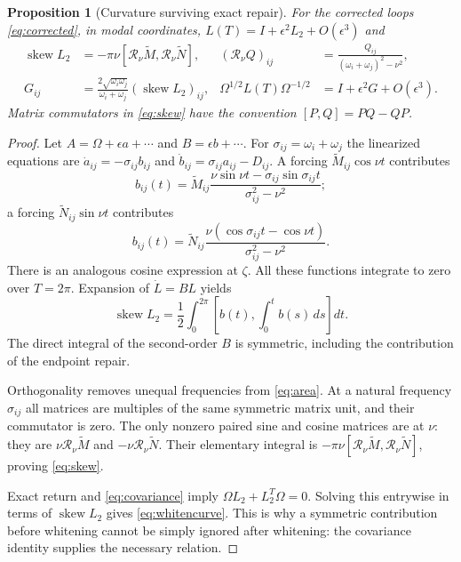 \documentclass[11pt]{article}
\numberwithin{equation}{section}
\newtheorem{proposition}[proposition]{Proposition}
\theoremstyle{definition}
\newcommand{\skw}{\operatorname{skew}}
\begin{document}
\begin{proposition}[Curvature surviving exact repair]\label{prop:curvature}
For the corrected loops \eqref{eq:corrected}, in modal coordinates,
$L(T)=I+\epsilon^2L_2+O(\epsilon^3)$ and
\begin{align}
 \skw L_2
   &=-\pi\nu[\mathcal R_\nu\widetilde M,
                        \mathcal R_\nu\widetilde N],
       &(\mathcal R_\nu Q)_{ij}
          &=\frac{Q_{ij}}{(\omega_i+\omega_j)^2-\nu^2},\label{eq:skew}\\
 G_{ij}
   &=\frac{2\sqrt{\omega_i\omega_j}}{\omega_i+\omega_j}
                      (\skw L_2)_{ij},
       &\Omega^{1/2}L(T)\Omega^{-1/2}
          &=I+\epsilon^2G+O(\epsilon^3).\label{eq:whitencurve}
\end{align}
Matrix commutators in \eqref{eq:skew} have the convention $[P,Q]=PQ-QP$.
\end{proposition}

\begin{proof}
Let $A=\Omega+\epsilon a+\cdots$ and $B=\epsilon b+\cdots$.
For $\sigma_{ij}=\omega_i+\omega_j$ the linearized equations are
$\dot a_{ij}=-\sigma_{ij}b_{ij}$ and
$\dot b_{ij}=\sigma_{ij}a_{ij}-D_{ij}$.
A forcing $\widetilde M_{ij}\cos\nu t$ contributes
\[
 b_{ij}(t)=\widetilde M_{ij}
       \frac{\nu\sin\nu t-\sigma_{ij}\sin\sigma_{ij}t}
            {\sigma_{ij}^2-\nu^2};
\]
a forcing $\widetilde N_{ij}\sin\nu t$ contributes
\[
 b_{ij}(t)=\widetilde N_{ij}
       \frac{\nu(\cos\sigma_{ij}t-\cos\nu t)}
            {\sigma_{ij}^2-\nu^2}.
\]
There is an analogous cosine expression at $\zeta$.
All these functions integrate to zero over $T=2\pi$.
Expansion of $\dot L=BL$ yields
\begin{equation}\label{eq:area}
 \skw L_2=\frac12\int_0^{2\pi}
       \left[b(t),\int_0^t b(s)\,ds\right]dt .
\end{equation}
The direct integral of the second-order $B$ is symmetric,
including the contribution of the endpoint repair.

Orthogonality removes unequal frequencies from \eqref{eq:area}.
At a natural frequency $\sigma_{ij}$ all matrices are multiples
of the same symmetric matrix unit, and their commutator is zero.
The only nonzero paired sine and cosine matrices are at $\nu$:
they are $\nu\mathcal R_\nu\widetilde M$ and
$-\nu\mathcal R_\nu\widetilde N$. Their elementary integral
is $-\pi\nu[\mathcal R_\nu\widetilde M,
\mathcal R_\nu\widetilde N]$, proving \eqref{eq:skew}.

Exact return and \eqref{eq:covariance} imply
$\Omega L_2+L_2^T\Omega=0$.
Solving this entrywise in terms of $\skw L_2$ gives
\eqref{eq:whitencurve}. This is why a symmetric contribution
before whitening cannot be simply ignored after whitening:
the covariance identity supplies the necessary relation.
\end{proof}
\end{document}
